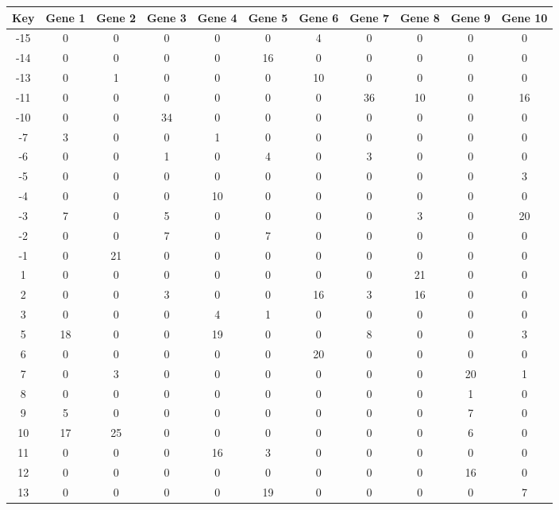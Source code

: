 \begin{tabular}{|c|c|c|c|c|c|c|c|c|c|c|}
\hline
Key & Gene 1 & Gene 2 & Gene 3 & Gene 4 & Gene 5 & Gene 6 & Gene 7 & Gene 8 & Gene 9 & Gene 10 \\
\hline
-15 & 0 & 0 & 0 & 0 & 0 & 4 & 0 & 0 & 0 & 0 \\
-14 & 0 & 0 & 0 & 0 & 16 & 0 & 0 & 0 & 0 & 0 \\
-13 & 0 & 1 & 0 & 0 & 0 & 10 & 0 & 0 & 0 & 0 \\
-11 & 0 & 0 & 0 & 0 & 0 & 0 & 36 & 10 & 0 & 16 \\
-10 & 0 & 0 & 34 & 0 & 0 & 0 & 0 & 0 & 0 & 0 \\
-7 & 3 & 0 & 0 & 1 & 0 & 0 & 0 & 0 & 0 & 0 \\
-6 & 0 & 0 & 1 & 0 & 4 & 0 & 3 & 0 & 0 & 0 \\
-5 & 0 & 0 & 0 & 0 & 0 & 0 & 0 & 0 & 0 & 3 \\
-4 & 0 & 0 & 0 & 10 & 0 & 0 & 0 & 0 & 0 & 0 \\
-3 & 7 & 0 & 5 & 0 & 0 & 0 & 0 & 3 & 0 & 20 \\
-2 & 0 & 0 & 7 & 0 & 7 & 0 & 0 & 0 & 0 & 0 \\
-1 & 0 & 21 & 0 & 0 & 0 & 0 & 0 & 0 & 0 & 0 \\
1 & 0 & 0 & 0 & 0 & 0 & 0 & 0 & 21 & 0 & 0 \\
2 & 0 & 0 & 3 & 0 & 0 & 16 & 3 & 16 & 0 & 0 \\
3 & 0 & 0 & 0 & 4 & 1 & 0 & 0 & 0 & 0 & 0 \\
5 & 18 & 0 & 0 & 19 & 0 & 0 & 8 & 0 & 0 & 3 \\
6 & 0 & 0 & 0 & 0 & 0 & 20 & 0 & 0 & 0 & 0 \\
7 & 0 & 3 & 0 & 0 & 0 & 0 & 0 & 0 & 20 & 1 \\
8 & 0 & 0 & 0 & 0 & 0 & 0 & 0 & 0 & 1 & 0 \\
9 & 5 & 0 & 0 & 0 & 0 & 0 & 0 & 0 & 7 & 0 \\
10 & 17 & 25 & 0 & 0 & 0 & 0 & 0 & 0 & 6 & 0 \\
11 & 0 & 0 & 0 & 16 & 3 & 0 & 0 & 0 & 0 & 0 \\
12 & 0 & 0 & 0 & 0 & 0 & 0 & 0 & 0 & 16 & 0 \\
13 & 0 & 0 & 0 & 0 & 19 & 0 & 0 & 0 & 0 & 7 \\
\hline
\end{tabular}